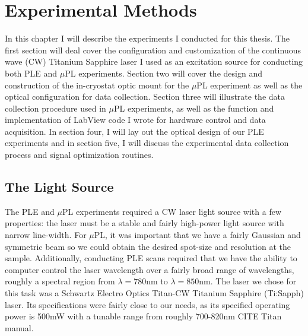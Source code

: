 \chapter{Experimental Methods}
In this chapter I will describe the experiments I conducted for this thesis. The first section will deal cover the configuration and customization of the continuous wave (CW) Titanium Sapphire laser I used as an excitation source for conducting both PLE and $\mu$PL experiments. Section two will cover the design and construction of the in-cryostat optic mount for the $\mu$PL experiment as well as the optical configuration for data collection. Section three will illustrate the data collection procedure used in $\mu$PL experiments, as well as the function and implementation of LabView code I wrote for hardware control and data acquisition. In section four, I will lay out the optical design of our PLE experiments and in section five, I will discuss the experimental data collection process and signal optimization routines.

\section{The Light Source}
\indent The PLE and $\mu$PL experiments required a CW laser light source with a few properties: the laser must be a stable and fairly high-power light source with narrow line-width. For $\mu$PL, it was important that we have a fairly Gaussian and symmetric beam so we could obtain the desired spot-size and resolution at the sample. Additionally, conducting PLE scans required that we have the ability to computer control the laser wavelength over a fairly broad range of wavelengths, roughly a spectral region from $\lambda = 780$nm to $\lambda = 850$nm. The laser we chose for this task was a Schwartz Electro Optics Titan-CW Titanium Sapphire (Ti:Sapph) laser. Its specifications were fairly close to our needs, as its specified operating power is 500mW with a tunable range from roughly 700-820nm CITE Titan manual. 

